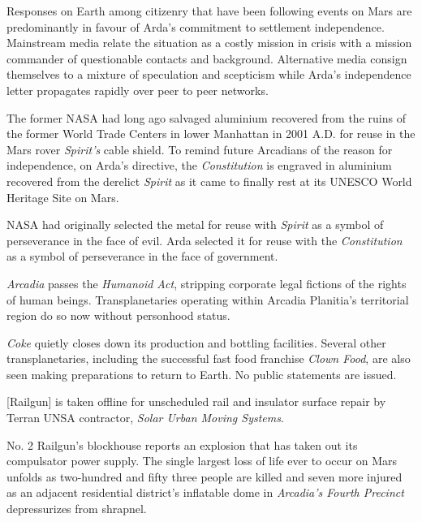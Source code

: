 Responses on Earth among citizenry that have been following events on Mars are predominantly in favour of Arda's commitment to settlement independence. Mainstream media relate the situation as a costly mission in crisis with a mission commander of questionable contacts and background. Alternative media consign themselves to a mixture of speculation and scepticism while Arda's independence letter propagates rapidly over peer to peer networks.
\StopTimelineDate

The former NASA had long ago salvaged aluminium recovered from the ruins of the former World Trade Centers in lower Manhattan in 2001 A.D. for reuse in the Mars rover {\it Spirit's} cable shield. To remind future Arcadians of the reason for independence, on Arda's directive, the {\it Constitution} is engraved in aluminium recovered from the derelict {\it Spirit} as it came to finally rest at its UNESCO World Heritage Site on Mars. 

NASA had originally selected the metal for reuse with {\it Spirit} as a symbol of perseverance in the face of evil. Arda selected it for reuse with the {\it Constitution} as a symbol of perseverance in the face of government.
\StopTimelineDate

{\it Arcadia} passes the {\it Humanoid Act}, stripping corporate legal fictions of the rights of human beings. Transplanetaries operating within Arcadia Planitia's territorial region do so now without personhood status.
\StopTimelineDate

{\it Coke} quietly closes down its production and bottling facilities. Several other transplanetaries, including the successful fast food franchise {\it Clown Food}, are also seen making preparations to return to Earth. No public statements are issued.
\StopTimelineDate

[Railgun] is taken offline for unscheduled rail and insulator surface repair by Terran UNSA contractor, {\it Solar Urban Moving Systems}.
\StopTimelineDate

No. \type{#}2 Railgun's blockhouse reports an explosion that has taken out its compulsator power supply. The single largest loss of life ever to occur on Mars unfolds as two-hundred and fifty three people are killed and seven more injured as an adjacent residential district's inflatable dome in {\it Arcadia's Fourth Precinct} depressurizes from shrapnel.

